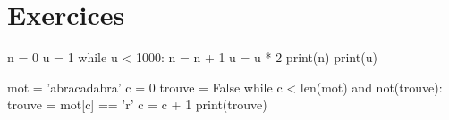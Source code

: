 			\section{Exercices}

	\begin{exercice_cours}{}
		\begin{minipage}{0.48\linewidth}
			\begin{CodePythontexAlt}[Largeur=1\linewidth,Centre,PremLigne=1]{}
			n = 0
			u = 1
			while u < 1000:
				n = n + 1
				u = u * 2
			print(n)
			print(u)
		\end{CodePythontexAlt}
				
		\end{minipage}\hfill
		\begin{minipage}{0.48\linewidth}
			\begin{CodePythontexAlt}[Largeur=1\linewidth,Centre,PremLigne=1]{}
			mot = 'abracadabra'
			c = 0
			trouve = False
			while c < len(mot) and not(trouve):
				trouve = mot[c] == 'r'
				c = c + 1
			print(trouve)
			\end{CodePythontexAlt}
		\end{minipage}\hfill
		 
	\end{exercice_cours}
	

